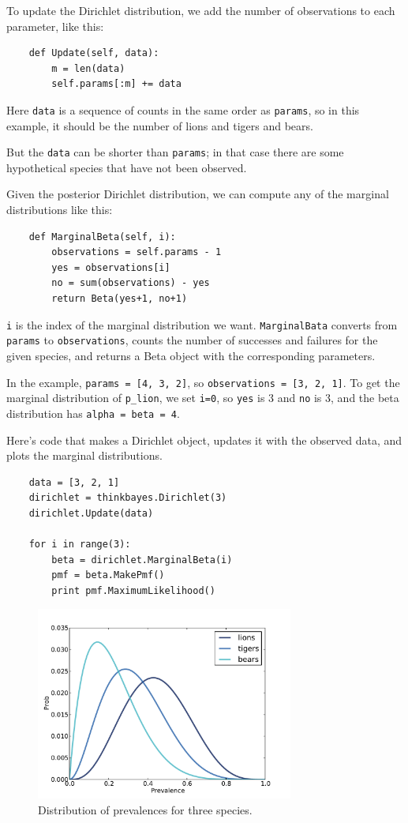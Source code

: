 \documentclass[12pt]{book}
\begin{document}
To update the Dirichlet distribution, we add the number of
observations to each parameter, like this:

\begin{verbatim}
    def Update(self, data):
        m = len(data)
        self.params[:m] += data
\end{verbatim}

Here {\tt data} is a sequence of counts in the same order
as {\tt params}, so in this example, it
should be the number of lions and tigers and bears.

But the {\tt data} can be shorter than {\tt params}; in that
case there are some hypothetical species that have not been
observed.

Given the posterior Dirichlet distribution, we can compute
any of the marginal distributions like this:

\begin{verbatim}
    def MarginalBeta(self, i):
        observations = self.params - 1
        yes = observations[i]
        no = sum(observations) - yes
        return Beta(yes+1, no+1)
\end{verbatim}

{\tt i} is the index of the marginal distribution we want.
{\tt MarginalBata} converts from {\tt params} to
{\tt observations}, counts the number of successes and
failures for the given species, and returns a Beta object with
the corresponding parameters.

In the example, {\tt params = [4, 3, 2]}, so {\tt observations = [3, 2, 1]}.
To get the marginal distribution of \verb"p_lion", we set {\tt i=0},
so {\tt yes} is 3 and {\tt no} is 3, and the beta
distribution has {\tt alpha = beta = 4}.

Here's code that makes a Dirichlet object, updates it with
the observed data, and plots the marginal distributions.

\begin{verbatim}
    data = [3, 2, 1]
    dirichlet = thinkbayes.Dirichlet(3)
    dirichlet.Update(data)

    for i in range(3):
        beta = dirichlet.MarginalBeta(i)
        pmf = beta.MakePmf()
        print pmf.MaximumLikelihood()
\end{verbatim}

\begin{figure}
\centerline{\includegraphics[height=2.5in]{figs/species1.pdf}}
\caption{Distribution of prevalences for three species.}
\label{fig.species1}
\end{figure}
\end{document}
